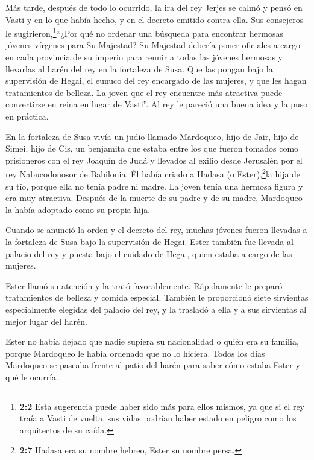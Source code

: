  Más tarde, después de todo lo ocurrido, la ira del rey
Jerjes se calmó y pensó en Vasti y en lo que había hecho, y en el
decreto emitido contra ella.  Sus consejeros le
sugirieron,\footnote{\textbf{2:2} Esta sugerencia puede haber sido más
  para ellos mismos, ya que si el rey traía a Vasti de vuelta, sus vidas
  podrían haber estado en peligro como los arquitectos de su caída.}``¿Por
qué no ordenar una búsqueda para encontrar hermosas jóvenes vírgenes
para Su Majestad?  Su Majestad debería poner oficiales a
cargo en cada provincia de su imperio para reunir a todas las jóvenes
hermosas y llevarlas al harén del rey en la fortaleza de Susa. Que las
pongan bajo la supervisión de Hegai, el eunuco del rey encargado de las
mujeres, y que les hagan tratamientos de belleza.  La joven
que el rey encuentre más atractiva puede convertirse en reina en lugar
de Vasti''. Al rey le pareció una buena idea y la puso en práctica.

 En la fortaleza de Susa vivía un judío llamado Mardoqueo,
hijo de Jair, hijo de Simei, hijo de Cis, un benjamita  que
estaba entre los que fueron tomados como prisioneros con el rey Joaquín
de Judá y llevados al exilio desde Jerusalén por el rey Nabucodonosor de
Babilonia.  Él había criado a Hadasa (o Ester),\footnote{\textbf{2:7}
  Hadasa era su nombre hebreo, Ester su nombre persa.}la hija de su tío,
porque ella no tenía padre ni madre. La joven tenía una hermosa figura y
era muy atractiva. Después de la muerte de su padre y de su madre,
Mardoqueo la había adoptado como su propia hija.

 Cuando se anunció la orden y el decreto del rey, muchas
jóvenes fueron llevadas a la fortaleza de Susa bajo la supervisión de
Hegai. Ester también fue llevada al palacio del rey y puesta bajo el
cuidado de Hegai, quien estaba a cargo de las mujeres.

 Ester llamó su atención y la trató favorablemente.
Rápidamente le preparó tratamientos de belleza y comida especial.
También le proporcionó siete sirvientas especialmente elegidas del
palacio del rey, y la trasladó a ella y a sus sirvientas al mejor lugar
del harén.

 Ester no había dejado que nadie supiera su nacionalidad o
quién era su familia, porque Mardoqueo le había ordenado que no lo
hiciera.  Todos los días Mardoqueo se paseaba frente al
patio del harén para saber cómo estaba Ester y qué le ocurría.

